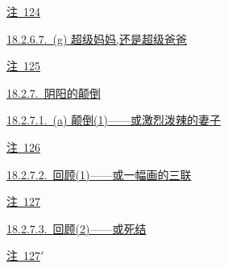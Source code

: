 \par\noindent\hspace*{4.05em}\hyperref[ch18:local:n28]{注~124}\nobreak\dotfill\nobreak\hyperref[ch18:local:n28]{\pageref*{ch18:local:n28}}\par
\par\noindent\hspace*{2.70em}\hyperref[ch18:local:h33]{18.2.6.7.~(g) 超级妈妈,还是超级爸爸}\nobreak\dotfill\nobreak\hyperref[ch18:local:h33]{\pageref*{ch18:local:h33}}\par
\par\noindent\hspace*{4.05em}\hyperref[ch18:local:n29]{注~125}\nobreak\dotfill\nobreak\hyperref[ch18:local:n29]{\pageref*{ch18:local:n29}}\par
\par\noindent\hspace*{1.35em}\hyperref[ch18:local:h34]{18.2.7.~阴阳的颠倒}\nobreak\dotfill\nobreak\hyperref[ch18:local:h34]{\pageref*{ch18:local:h34}}\par
\par\noindent\hspace*{2.70em}\hyperref[ch18:local:h35]{18.2.7.1.~(a) 颠倒(1)——或激烈泼辣的妻子}\nobreak\dotfill\nobreak\hyperref[ch18:local:h35]{\pageref*{ch18:local:h35}}\par
\par\noindent\hspace*{4.05em}\hyperref[ch18:local:n30]{注~126}\nobreak\dotfill\nobreak\hyperref[ch18:local:n30]{\pageref*{ch18:local:n30}}\par
\par\noindent\hspace*{2.70em}\hyperref[ch18:local:h36]{18.2.7.2.~回顾(1)——或一幅画的三联}\nobreak\dotfill\nobreak\hyperref[ch18:local:h36]{\pageref*{ch18:local:h36}}\par
\par\noindent\hspace*{4.05em}\hyperref[ch18:local:n31]{注~127}\nobreak\dotfill\nobreak\hyperref[ch18:local:n31]{\pageref*{ch18:local:n31}}\par
\par\noindent\hspace*{2.70em}\hyperref[ch18:local:h37]{18.2.7.3.~回顾(2)——或死结}\nobreak\dotfill\nobreak\hyperref[ch18:local:h37]{\pageref*{ch18:local:h37}}\par
\par\noindent\hspace*{4.05em}\hyperref[ch18:local:n32]{注~127$'$}\nobreak\dotfill\nobreak\hyperref[ch18:local:n32]{\pageref*{ch18:local:n32}}\par
